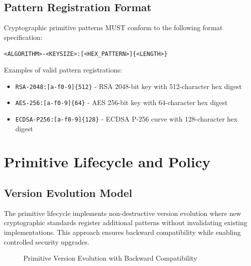 \documentclass[11pt,a4paper]{article}
\begin{document}
\subsection{Pattern Registration Format}

Cryptographic primitive patterns MUST conform to the following format specification:

\begin{center}
\texttt{<ALGORITHM>-<KEYSIZE>:[<HEX\_PATTERN>]\{<LENGTH>\}}
\end{center}

Examples of valid pattern registrations:
\begin{itemize}
    \item \texttt{RSA-2048:[a-f0-9]\{512\}} - RSA 2048-bit key with 512-character hex digest
    \item \texttt{AES-256:[a-f0-9]\{64\}} - AES 256-bit key with 64-character hex digest
    \item \texttt{ECDSA-P256:[a-f0-9]\{128\}} - ECDSA P-256 curve with 128-character hex digest
\end{itemize}

\section{Primitive Lifecycle and Policy}

\subsection{Version Evolution Model}

The primitive lifecycle implements non-destructive version evolution where new cryptographic standards register additional patterns without invalidating existing implementations. This approach ensures backward compatibility while enabling controlled security upgrades.

\begin{figure}[h]
\centering
{}
\caption{Primitive Version Evolution with Backward Compatibility}
\end{figure}
\end{document}
